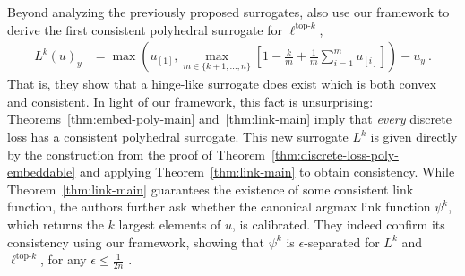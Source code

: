 \documentclass[11pt]{article}
\newcommand{\reals}{\mathbb{R}}
\newcommand{\prop}[1]{\mathrm{prop}[#1]}
\newcommand{\elltopk}{\ell^{\text{top-$k$}}}
\begin{document}
Beyond analyzing the previously proposed surrogates, \citeauthor{finocchiaro2022consistenttopk} also use our framework to derive the first consistent polyhedral surrogate for $\elltopk$,
\begin{align}\label{eq:topk-embedding}
L^k(u)_y &= \max \left(u_{[1]}, \max_{m \in \{k+1, \ldots, n\}} \left[ 1 - \frac k m + \frac 1 m \sum_{i=1}^m u_{[i]}\right] \right)- u_y~.
\end{align}
That is, they show that a hinge-like surrogate does exist which is both convex and consistent.
In light of our framework, this fact is unsurprising: Theorems~\ref{thm:embed-poly-main} and~\ref{thm:link-main} imply that \emph{every} discrete loss has a consistent polyhedral surrogate.
This new surrogate $L^k$ is given directly by the construction from the proof of Theorem~\ref{thm:discrete-loss-poly-embeddable} and applying Theorem~\ref{thm:link-main} to obtain consistency.
While Theorem~\ref{thm:link-main} guarantees the existence of some consistent link function, the authors further ask whether the canonical argmax link function $\psi^k$, which returns the $k$ largest elements of $u$, is calibrated.
They indeed confirm its consistency using our framework, showing that $\psi^k$ is $\epsilon$-separated for $L^k$ and $\elltopk$, for any $\epsilon \leq \frac 1 {2n}$ \citep[Theorem 4.4]{finocchiaro2022consistenttopk}.


\end{document}
